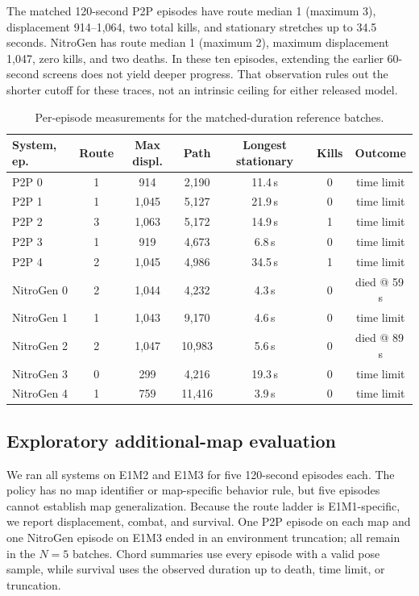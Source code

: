 \documentclass[11pt]{article}
\begin{document}
The matched 120-second P2P episodes have route median 1 (maximum 3), displacement 914--1{,}064, two total kills, and stationary stretches up to 34.5 seconds. NitroGen has route median 1 (maximum 2), maximum displacement 1{,}047, zero kills, and two deaths. In these ten episodes, extending the earlier 60-second screens does not yield deeper progress. That observation rules out the shorter cutoff for these traces, not an intrinsic ceiling for either released model.

\begin{table}[ht]
\centering
\small
\begin{tabular}{lcccccc}
\toprule
System, ep. & Route & Max displ. & Path & Longest stationary & Kills & Outcome \\
\midrule
P2P 0 & 1 & 914 & 2{,}190 & 11.4\,s & 0 & time limit \\
P2P 1 & 1 & 1{,}045 & 5{,}127 & 21.9\,s & 0 & time limit \\
P2P 2 & 3 & 1{,}063 & 5{,}172 & 14.9\,s & 1 & time limit \\
P2P 3 & 1 & 919 & 4{,}673 & 6.8\,s & 0 & time limit \\
P2P 4 & 2 & 1{,}045 & 4{,}986 & 34.5\,s & 1 & time limit \\
\midrule
NitroGen 0 & 2 & 1{,}044 & 4{,}232 & 4.3\,s & 0 & died @ 59\,s \\
NitroGen 1 & 1 & 1{,}043 & 9{,}170 & 4.6\,s & 0 & time limit \\
NitroGen 2 & 2 & 1{,}047 & 10{,}983 & 5.6\,s & 0 & died @ 89\,s \\
NitroGen 3 & 0 & 299 & 4{,}216 & 19.3\,s & 0 & time limit \\
NitroGen 4 & 1 & 759 & 11{,}416 & 3.9\,s & 0 & time limit \\
\bottomrule
\end{tabular}
\caption{Per-episode measurements for the matched-duration reference batches.}
\label{tab:baseline-eps}
\end{table}

\subsection{Exploratory additional-map evaluation}\label{sec:maps}

We ran all systems on E1M2 and E1M3 for five 120-second episodes each. The policy has no map identifier or map-specific behavior rule, but five episodes cannot establish map generalization. Because the route ladder is E1M1-specific, we report displacement, combat, and survival. One P2P episode on each map and one NitroGen episode on E1M3 ended in an environment truncation; all remain in the $N{=}5$ batches. Chord summaries use every episode with a valid pose sample, while survival uses the observed duration up to death, time limit, or truncation.
\end{document}
